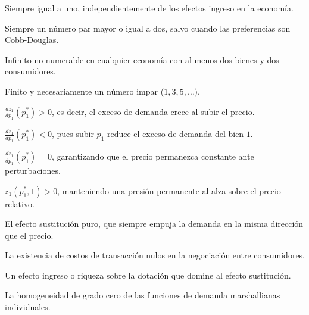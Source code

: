 \begin{opts}
    \item Siempre igual a uno, independientemente de los efectos ingreso en la economía.
    \item Siempre un número par mayor o igual a dos, salvo cuando las preferencias son Cobb-Douglas.
    \item Infinito no numerable en cualquier economía con al menos dos bienes y dos consumidores.
    \item Finito y necesariamente un número impar ($1, 3, 5, \dots$).
\end{opts}

\begin{opts}
    \item $\frac{dz_1}{dp_1}(p_1^*) > 0$, es decir, el exceso de demanda crece al subir el precio.
    \item $\frac{dz_1}{dp_1}(p_1^*) < 0$, pues subir $p_1$ reduce el exceso de demanda del bien $1$.
    \item $\frac{dz_1}{dp_1}(p_1^*) = 0$, garantizando que el precio permanezca constante ante perturbaciones.
    \item $z_1(p_1^*, 1) > 0$, manteniendo una presión permanente al alza sobre el precio relativo.
\end{opts}

\begin{opts}
    \item El efecto sustitución puro, que siempre empuja la demanda en la misma dirección que el precio.
    \item La existencia de costos de transacción nulos en la negociación entre consumidores.
    \item Un efecto ingreso o riqueza sobre la dotación que domine al efecto sustitución.
    \item La homogeneidad de grado cero de las funciones de demanda marshallianas individuales.
\end{opts}

